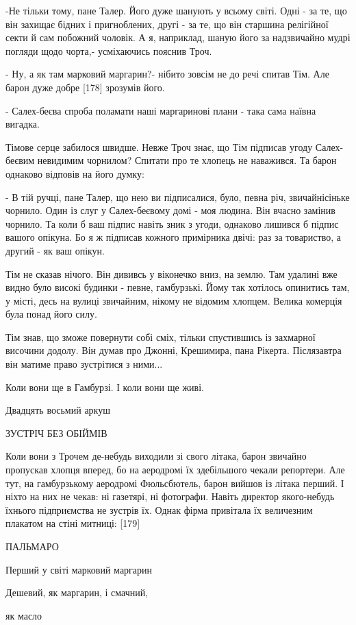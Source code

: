-Не тільки тому, пане Талер. Його дуже шанують у всьому світі. Одні - за те, що він захищає бідних і пригноблених, другі - за те, що він старшина релігійної секти й сам побожний чоловік. А я, наприклад, шаную його за надзвичайно мудрі погляди щодо чорта,- усміхаючись пояснив Троч.

- Ну, а як там марковий маргарин?- нібито зовсім не до речі спитав Тім. Але барон дуже добре [178] зрозумів його.

- Салех-беєва спроба поламати наші маргаринові плани - така сама наївна вигадка.

Тімове серце забилося швидше. Невже Троч знає, що Тім підписав угоду Салех-беєвим невидимим чорнилом? Спитати про те хлопець не наважився. Та барон однаково відповів на його думку:

- В тій ручці, пане Талер, що нею ви підписалися, було, певна річ, звичайнісіньке чорнило. Один із слуг у Салех-беєвому домі - моя людина. Він вчасно замінив чорнило. Та коли б ваш підпис навіть зник з угоди, однаково лишився б підпис вашого опікуна. Бо я ж підписав кожного примірника двічі: раз за товариство, а другий - як ваш опікун.

Тім не сказав нічого. Він дививсь у віконечко вниз, на землю. Там удалині вже видно було високі будинки - певне, гамбурзькі. Йому так хотілось опинитись там, у місті, десь на вулиці звичайним, нікому не відомим хлопцем. Велика комерція була понад його силу.

Тім знав, що зможе повернути собі сміх, тільки спустившись із захмарної височини додолу. Він думав про Джонні, Крешимира, пана Рікерта. Післязавтра він матиме право зустрітися з ними...

Коли вони ще в Гамбурзі. І коли вони ще живі.

Двадцять восьмий аркуш

ЗУСТРІЧ БЕЗ ОБІЙМІВ

Коли вони з Трочем де-небудь виходили зі свого літака, барон звичайно пропускав хлопця вперед, бо на аеродромі їх здебільшого чекали репортери. Але тут, на гамбурзькому аеродромі Фюльсбютель, барон вийшов із літака перший. І ніхто на них не чекав: ні газетярі, ні фотографи. Навіть директор якого-небудь їхнього підприємства не зустрів їх. Однак фірма привітала їх величезним плакатом на стіні митниці: [179]

ПАЛЬМАРО

Перший у світі марковий маргарин

Дешевий, як маргарин, і смачний,

як масло

